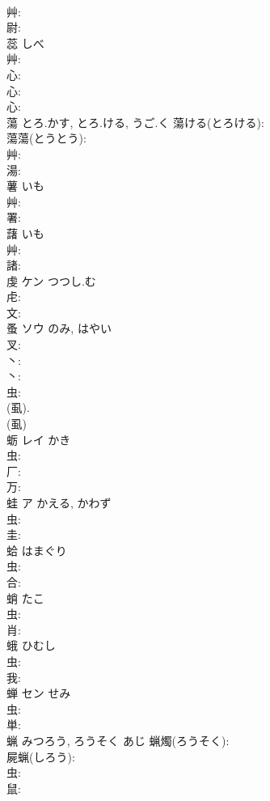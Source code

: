 \documentclass[8pt]{extreport}
\begin{document}
\begin{CJK}{UTF8}{min}
\\	艸: 
\\	尉: 
\\	蕊		しべ				
\\	艸: 
\\	心: 
\\	心: 
\\	心: 
\\	蕩		とろ.かす, とろ.ける, うご.く			蕩ける(とろける): 
\\	蕩蕩(とうとう): 
\\	艸: 
\\	湯: 
\\	薯		いも				
\\	艸: 
\\	署: 
\\	藷		いも				
\\	艸: 
\\	諸: 
\\	虔	ケン	つつし.む		
\\	虍: 
\\	文: 
\\	蚤	ソウ	のみ, はやい		
\\	叉: 
\\	丶: 
\\	丶: 
\\	虫: 
\\	(虱). 
\\	(虱) 
\\	蛎	レイ	かき		
\\	虫: 
\\	厂: 
\\	万: 
\\	蛙	ア	かえる, かわず		
\\	虫: 
\\	圭: 
\\	蛤		はまぐり				
\\	虫: 
\\	合: 
\\	蛸		たこ				
\\	虫: 
\\	肖: 
\\	蛾		ひむし				
\\	虫: 
\\	我: 
\\	蝉	セン	せみ		
\\	虫: 
\\	単: 
\\	蝋		みつろう, ろうそく	あじ		蝋燭(ろうそく): 
\\	屍蝋(しろう): 
\\	虫: 
\\	鼠: 

\end{CJK}
\end{document}
